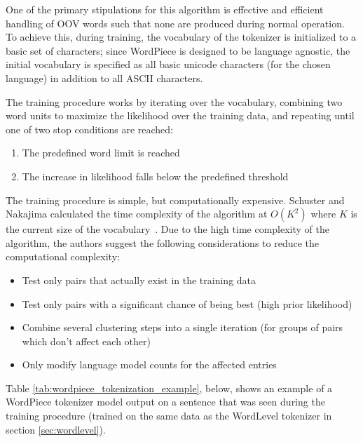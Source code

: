\documentclass[12pt]{article}
\begin{document}
One of the primary stipulations for this algorithm is effective and efficient handling of OOV words such that none are produced during normal
operation. To achieve this, during training, the vocabulary of the tokenizer is initialized to a basic set of characters; since WordPiece is designed
to be language agnostic, the initial vocabulary is specified as all basic unicode characters (for the chosen language) in addition to all ASCII
characters.

The training procedure works by iterating over the vocabulary, combining two word units to maximize the likelihood over the training data, and
repeating until one of two stop conditions are reached:

\begin{enumerate}
    \item The predefined word limit is reached
    \item The increase in likelihood falls below the predefined threshold
\end{enumerate}

\noindent
The training procedure is simple, but computationally expensive. Schuster and Nakajima calculated the time complexity of the algorithm at $O(K^2)$
where $K$ is the current size of the vocabulary~\cite{schuster_japanese_2012}. Due to the high time complexity of the algorithm, the authors suggest
the following considerations to reduce the computational complexity:

\begin{itemize}
    \item Test only pairs that actually exist in the training data
    \item Test only pairs with a significant chance of being best (high prior likelihood)
    \item Combine several clustering steps into a single iteration (for groups of pairs which don't affect each other)
    \item Only modify language model counts for the affected entries
\end{itemize}

Table \ref{tab:wordpiece_tokenization_example}, below, shows an example of a WordPiece tokenizer model output on a sentence that was seen during the
training procedure (trained on the same data as the WordLevel tokenizer in section \ref{sec:wordlevel}).
\end{document}
